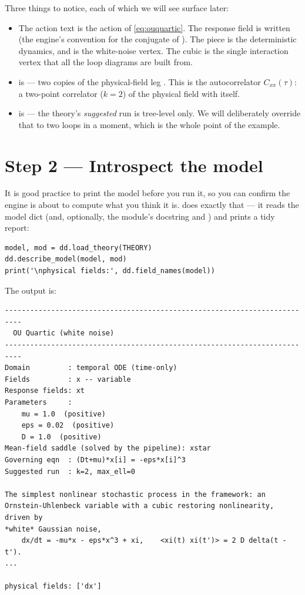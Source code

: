 Three things to notice, each of which we will see surface later:

\begin{itemize}
  \item The action text is the \msrjd{} action of \eqref{eq:ouquartic}. The
        response field is written  (the engine's convention for the
        conjugate of ). The piece  is the deterministic dynamics, and 
        is the white-noise vertex. The cubic  is the single
        interaction vertex that all the loop diagrams are built from.
  \item {} is
        \code{[('dx', 1), ('dx', 1)]} --- two copies of the physical-field leg
        . This is the autocorrelator $C_{xx}(\tau)$: a two-point
        correlator ($k = 2$) of the physical field with itself.
  \item {} is  --- the theory's
        \emph{suggested} run is tree-level only. We will deliberately override
        that to two loops in a moment, which is the whole point of the example.
\end{itemize}

\section{Step 2 --- Introspect the model}

It is good practice to print the model before you run it, so you can confirm the
engine is about to compute what you think it is.  does
exactly that --- it reads the model dict (and, optionally, the module's
docstring and ) and prints a tidy report:

\begin{lstlisting}
model, mod = dd.load_theory(THEORY)
dd.describe_model(model, mod)
print('\nphysical fields:', dd.field_names(model))
\end{lstlisting}

The output is:

\begin{lstlisting}[style=console]
--------------------------------------------------------------------------
  OU Quartic (white noise)
--------------------------------------------------------------------------
Domain         : temporal ODE (time-only)
Fields         : x -- variable
Response fields: xt
Parameters     :
    mu = 1.0  (positive)
    eps = 0.02  (positive)
    D = 1.0  (positive)
Mean-field saddle (solved by the pipeline): xstar
Governing eqn  : (Dt+mu)*x[i] = -eps*x[i]^3
Suggested run  : k=2, max_ell=0

The simplest nonlinear stochastic process in the framework: an
Ornstein-Uhlenbeck variable with a cubic restoring nonlinearity, driven by
*white* Gaussian noise,
    dx/dt = -mu*x - eps*x^3 + xi,    <xi(t) xi(t')> = 2 D delta(t - t').
...

physical fields: ['dx']
\end{lstlisting}

